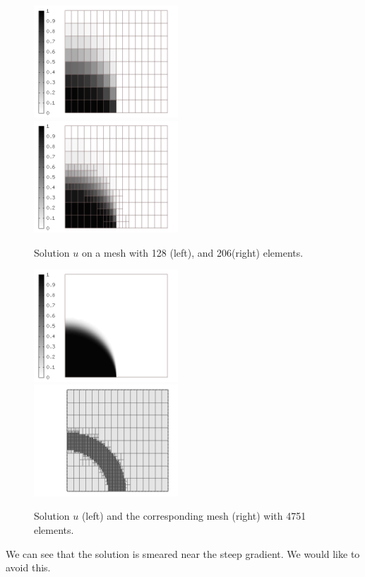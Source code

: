 \begin{figure}[H]
\begin{center}
\includegraphics[width=0.48\textwidth]{minor_examples/FVM00.png}\ \ \ 
\includegraphics[width=0.48\textwidth]{minor_examples/FVM01.png}
\end{center}
\vspace{-4mm}
\caption{Solution $u$ on a mesh with 128 (left), and 206(right) elements.}
\end{figure}

\begin{figure}[H]
\begin{center}
\includegraphics[width=0.48\textwidth]{minor_examples/FVM02.png}\ \ \ 
\includegraphics[width=0.48\textwidth]{minor_examples/FVM02Mesh.png}
\end{center}
\vspace{-4mm}
\caption{Solution $u$ (left) and the corresponding mesh (right) with 4751 elements.}
\end{figure}
We can see that the solution is smeared near the steep gradient. We would like to avoid this.

